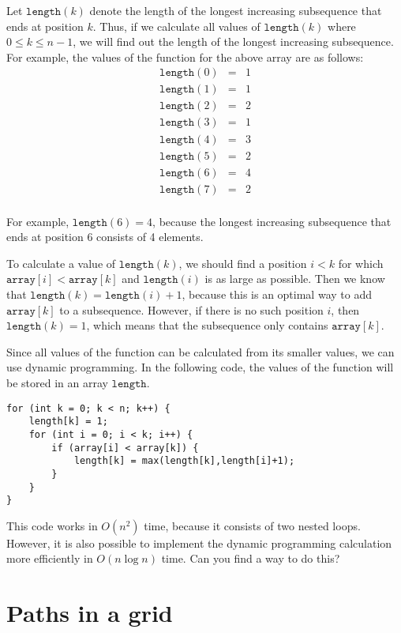 Let $\texttt{length}(k)$ denote
the length of the
longest increasing subsequence
that ends at position $k$.
Thus, if we calculate all values of
$\texttt{length}(k)$ where $0 \le k \le n-1$,
we will find out the length of the
longest increasing subsequence.
For example, the values of the function
for the above array are as follows:
\[
\begin{array}{lcl}
\texttt{length}(0) & = & 1 \\
\texttt{length}(1) & = & 1 \\
\texttt{length}(2) & = & 2 \\
\texttt{length}(3) & = & 1 \\
\texttt{length}(4) & = & 3 \\
\texttt{length}(5) & = & 2 \\
\texttt{length}(6) & = & 4 \\
\texttt{length}(7) & = & 2 \\
\end{array}
\]

For example, $\texttt{length}(6)=4$,
because the longest increasing subsequence
that ends at position 6 consists of 4 elements.

To calculate a value of $\texttt{length}(k)$,
we should find a position $i<k$
for which $\texttt{array}[i]<\texttt{array}[k]$
and $\texttt{length}(i)$ is as large as possible.
Then we know that
$\texttt{length}(k)=\texttt{length}(i)+1$,
because this is an optimal way to add
$\texttt{array}[k]$ to a subsequence.
However, if there is no such position $i$,
then $\texttt{length}(k)=1$,
which means that the subsequence only contains
$\texttt{array}[k]$.

Since all values of the function can be calculated
from its smaller values,
we can use dynamic programming.
In the following code, the values
of the function will be stored in an array
$\texttt{length}$.

\begin{lstlisting}
for (int k = 0; k < n; k++) {
    length[k] = 1;
    for (int i = 0; i < k; i++) {
        if (array[i] < array[k]) {
            length[k] = max(length[k],length[i]+1);
        }
    }
}
\end{lstlisting}

This code works in $O(n^2)$ time,
because it consists of two nested loops.
However, it is also possible to implement
the dynamic programming calculation
more efficiently in $O(n \log n)$ time.
Can you find a way to do this?

\section{Paths in a grid}

